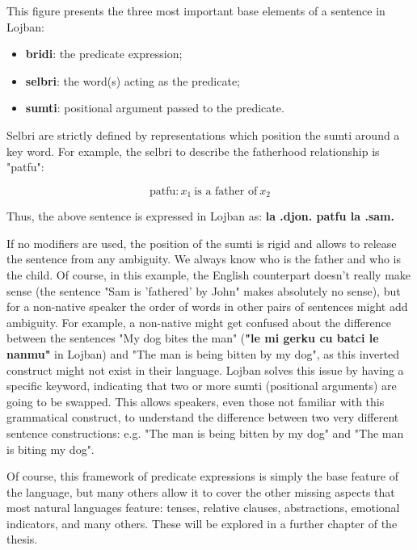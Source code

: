 This figure presents the three most important base elements of a sentence in Lojban:

\begin{itemize}
    \item \textbf{bridi}: the predicate expression;
    \item \textbf{selbri}: the word(s) acting as the predicate;
    \item \textbf{sumti}: positional argument passed to the predicate.
\end{itemize}

Selbri are strictly defined by representations which position the sumti around a key word. For example, the selbri to describe the fatherhood relationship is "patfu":

$$\text{patfu}: x_1 \: \text{is a father of} \: x_2$$

Thus, the above sentence is expressed in Lojban as: \textbf{la .djon. patfu la .sam.} \newline

If no modifiers are used, the position of the sumti is rigid and allows to release the sentence from any ambiguity. We always know who is the father and who is the child.
Of course, in this example, the English counterpart doesn't really make sense (the sentence "Sam is 'fathered' by John" makes absolutely no sense), but for a non-native speaker
the order of words in other pairs of sentences might add ambiguity. For example, a non-native might get confused about the difference between the sentences
"My dog bites the man" (\textbf{"le mi gerku cu batci le nanmu"} in Lojban) and "The man is being bitten by my dog", as this inverted construct might not exist in their language.
Lojban solves this issue by having a specific keyword, indicating that two or more sumti (positional arguments) are going to be swapped. This allows speakers, even those not
familiar with this grammatical construct, to understand the difference between two very different sentence constructions: e.g. "The man is being bitten by my dog"
and "The man is biting my dog".\newline

Of course, this framework of predicate expressions is simply the base feature of the language, but many others allow it to cover the other missing aspects that most natural
languages feature: tenses, relative clauses, abstractions, emotional indicators, and many others. These will be explored in a further chapter of the thesis. \newline

